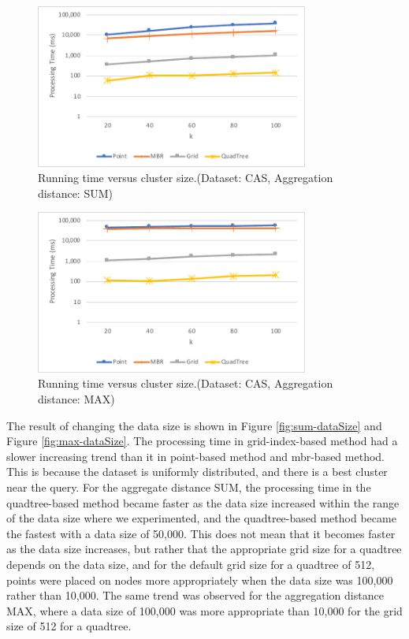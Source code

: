 \documentclass[a4paper,11pt]{report}
\theoremstyle{mytheoremstyle}
\begin{document}
\begin{figure}
    \begin{center}
        \includegraphics[width=0.8\textwidth]{src/images/CAS-SUM-K.pdf}
    \end{center}
    \caption{Running time versus cluster size.(Dataset: CAS, Aggregation distance: SUM)}
    \label{fig:sum-clusterSize-CAS}
\end{figure}

\begin{figure}
    \begin{center}
        \includegraphics[width=0.8\textwidth]{src/images/CAS-MAX-K.pdf}
    \end{center}
    \caption{Running time versus cluster size.(Dataset: CAS, Aggregation distance: MAX)}
    \label{fig:max-clusterSize-CAS}
\end{figure}

The result of changing the data size is shown in Figure \ref{fig:sum-dataSize} and Figure \ref{fig:max-dataSize}. The processing time in grid-index-based method had a slower increasing trend than it in point-based method and mbr-based method. This is because the dataset is uniformly distributed, and there is a best cluster near the query.
For the aggregate distance SUM, the processing time in the quadtree-based method became faster as the data size increased within the range of the data size where we experimented, and the quadtree-based method became the fastest with a data size of 50,000. This does not mean that it becomes faster as the data size increases, but rather that the appropriate grid size for a quadtree depends on the data size, and for the default grid size for a quadtree of 512, points were placed on nodes more appropriately when the data size was 100,000 rather than 10,000. The same trend was observed for the aggregation distance MAX, where a data size of 100,000 was more appropriate than 10,000 for the grid size of 512 for a quadtree.
\end{document}
